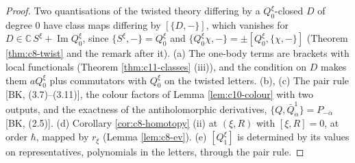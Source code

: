 \begin{proof}
Two quantisations of the twisted theory differing by a $Q^\xi_0$-closed $D$ of degree $0$ have class maps differing by $[\{D,-\}]$, which vanishes for $D\in\mathbb C\,S^\xi+\operatorname{Im}Q^\xi_0$, since $\{S^\xi,-\}=Q^\xi_0$ and $\{Q^\xi_0\chi,-\}=\pm[Q^\xi_0,\{\chi,-\}]$ (Theorem \ref{thm:c8-twist} and the remark after it). (a) The one-body terms are brackets with local functionals (Theorem \ref{thm:c11-classes} (iii)), and the condition on $D$ makes them $aQ^\xi_0$ plus commutators with $Q^\xi_0$ on the twisted letters. (b), (c) The pair rule [BK, (3.7)--(3.11)], the colour factors of Lemma \ref{lem:c10-colour} with two outputs, and the exactness of the antiholomorphic derivatives, $\{Q,\bar Q^1_{\dot\alpha}\}=P_{-\dot\alpha}$ [BK, (2.5)]. (d) Corollary \ref{cor:c8-homotopy} (ii) at $(\xi,R)$ with $[\xi,R]=0$, at order $\hbar$, mapped by $r_\xi$ (Lemma \ref{lem:c8-ev}). (e) $[Q^\xi_1]$ is determined by its values on representatives, polynomials in the letters, through the pair rule.
\end{proof}

